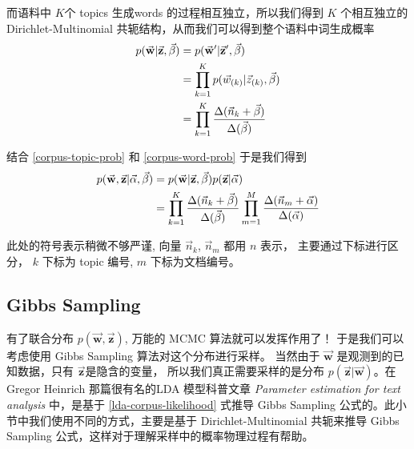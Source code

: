 而语料中 $K$个 topics 生成words 的过程相互独立，所以我们得到 $K$ 个相互独立的
Dirichlet-Multinomial 共轭结构，从而我们可以得到整个语料中词生成概率
\begin{align}
\label{corpus-word-prob}
p(\vec{\mathbf{w}} |\vec{\mathbf{z}},\vec{\beta}) &= p(\vec{\mathbf{w}}' |\vec{\mathbf{z}}',\vec{\beta}) \notag \\
&= \prod_{k=1}^K p(\vec{w}_{(k)} | \vec{z}_{(k)}, \vec{\beta}) \notag \\
&= \prod_{k=1}^K \frac{\Delta(\vec{n}_k+\vec{\beta})}{\Delta(\vec{\beta})}
\end{align}

结合 \eqref{corpus-topic-prob} 和 \eqref{corpus-word-prob} 于是我们得到
\begin{align}
\label{lda-corpus-likelihood}
p(\vec{\mathbf{w}},\vec{\mathbf{z}} |\vec{\alpha}, \vec{\beta}) &=
p(\vec{\mathbf{w}} |\vec{\mathbf{z}}, \vec{\beta}) p(\vec{\mathbf{z}} |\vec{\alpha})  \notag \\
&= \prod_{k=1}^K \frac{\Delta(\vec{n}_k+\vec{\beta})}{\Delta(\vec{\beta})}
\prod_{m=1}^M \frac{\Delta(\vec{n}_m+\vec{\alpha})}{\Delta(\vec{\alpha})}
\end{align}

此处的符号表示稍微不够严谨, 向量 $\vec{n}_k$,  $\vec{n}_m$ 都用 $n$ 表示， 主要通过下标进行区分，
$k$ 下标为 topic 编号, $m$ 下标为文档编号。

\subsection{Gibbs Sampling}
有了联合分布 $p(\vec{\mathbf{w}},\vec{\mathbf{z}})$, 万能的 MCMC 算法就可以发挥作用了！
于是我们可以考虑使用 Gibbs Sampling 算法对这个分布进行采样。
当然由于 $\vec{\mathbf{w}}$ 是观测到的已知数据，只有 $\vec{\mathbf{z}}$是隐含的变量，
所以我们真正需要采样的是分布 $p(\vec{\mathbf{z}}|\vec{\mathbf{w}})$。在 Gregor Heinrich
那篇很有名的LDA 模型科普文章 \emph{Parameter estimation for text analysis} 中，是基于
\eqref{lda-corpus-likelihood} 式推导 Gibbs Sampling 公式的。此小节中我们使用不同的方式，主要是基于
Dirichlet-Multinomial 共轭来推导 Gibbs Sampling 公式，这样对于理解采样中的概率物理过程有帮助。

